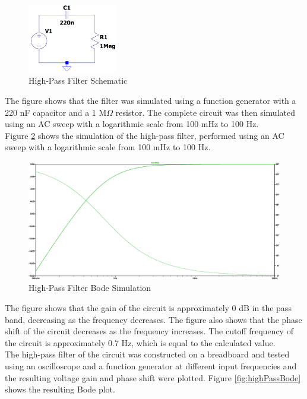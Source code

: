 \documentclass[CMPE]{KGCOEReport}
\begin{document}
\begin{figure}[H]
    \centering
    \includegraphics[width=0.35\textwidth]{HighPass.png}
    \caption{High-Pass Filter Schematic}
    \label{fig:ltspiceHighPassSchematic}
\end{figure}

The figure shows that the filter was simulated using a function generator with a 220 nF capacitor and a 1 M$\Omega$ resistor. The complete circuit was then simulated using an AC sweep with a logarithmic scale from 100 mHz to 100 Hz.\\

Figure \ref{fig:highPassSim} shows the simulation of the high-pass filter, performed using an AC sweep with a logarithmic scale from 100 mHz to 100 Hz.

\begin{figure}[H]
    \centering
    \includegraphics[width=1\textwidth]{SimFreqHighPass.png}
    \caption{High-Pass Filter Bode Simulation}
    \label{fig:highPassSim}
\end{figure}

The figure shows that the gain of the circuit is approximately 0 dB in the pass band, decreasing as the frequency decreases. The figure also shows that the phase shift of the circuit decreases as the frequency increases. The cutoff frequency of the circuit is approximately 0.7 Hz, which is equal to the calculated value.\\

The high-pass filter of the circuit was constructed on a breadboard and tested using an oscilloscope and a function generator at different input frequencies and the resulting voltage gain and phase shift were plotted. Figure \ref{fig:highPassBode} shows the resulting Bode plot.
\end{document}
